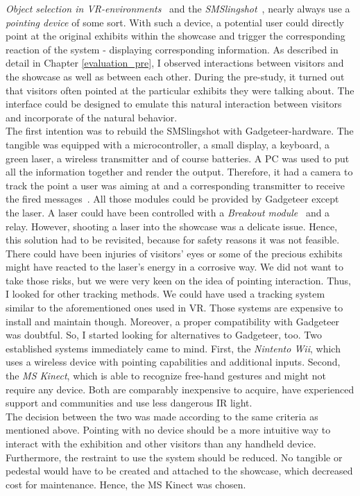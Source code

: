 \textit{Object selection in \ac{VR}-environments}~\cite{VRObjectSelectionCnG} and the \textit{SMSlingshot}~\cite{SMSlingshot}, nearly always use a \textit{pointing device} of some sort. With such a device, a potential user could directly point at the original exhibits within the showcase and trigger the corresponding reaction of the system - displaying corresponding information. As described in detail in Chapter \ref{evaluation_pre}, I observed interactions between visitors and the showcase as well as between each other. During the pre-study, it turned out that visitors often pointed at the particular exhibits they were talking about. The interface could be designed to emulate this natural interaction between visitors and incorporate of the natural behavior.
\\
The first intention was to rebuild the SMSlingshot with Gadgeteer-hardware. The tangible was equipped with a microcontroller, a small display, a keyboard, a green laser, a wireless transmitter and of course batteries. A PC was used to put all the information together and render the output. Therefore, it had a camera to track the point a user was aiming at and a corresponding transmitter to receive the fired messages~\cite{SMSlingshot}. All those modules could be provided by Gadgeteer except the laser. A laser could have been controlled with a \textit{Breakout module}~\cite{BreakoutGHI} and a relay. However, shooting a laser into the showcase was a delicate issue. Hence, this solution had to be revisited, because for safety reasons it was not feasible. There could have been injuries of visitors' eyes or some of the precious exhibits might have reacted to the laser's energy in a corrosive way. We did not want to take those risks, but we were very keen on the idea of pointing interaction. Thus, I looked for other tracking methods. We could have used a tracking system similar to the aforementioned ones used in \ac{VR}. Those systems are expensive to install and maintain though. Moreover, a proper compatibility with Gadgeteer was doubtful. So, I started looking for alternatives to Gadgeteer, too. Two established systems immediately came to mind. First, the \textit{Nintento Wii}, which uses a wireless device with pointing capabilities and additional inputs. Second, the \textit{\ac{MS} Kinect}, which is able to recognize free-hand gestures and might not require any device. Both are comparably inexpensive to acquire, have experienced support and communities and use less dangerous \ac{IR} light.
\\
The decision between the two was made according to the same criteria as mentioned above. Pointing with no device should be a more intuitive way to interact with the exhibition and other visitors than any handheld device. Furthermore, the restraint to use the system should be reduced. No tangible or pedestal would have to be created and attached to the showcase, which decreased cost for maintenance. Hence, the \ac{MS} Kinect was chosen.
